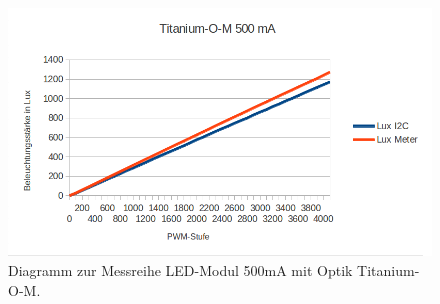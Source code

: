 \documentclass[a4paper,12pt]{scrartcl}
\begin{document}


\begin{figure}[H]
  \begin{center}
    \includegraphics[width=1\hsize]{./images/500-m-print.png}
  \end{center}
\caption[Diagramm zur Messreihe LED-Modul 500mA mit Optik Titanium-O-M]{\label{diagram500matitm}Diagramm zur Messreihe LED-Modul 500mA mit Optik
Titanium-O-M.}
\end{figure}
\end{document}
